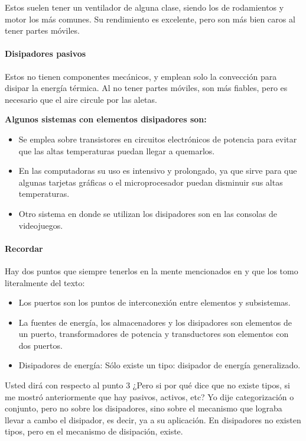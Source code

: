 Estos suelen tener un ventilador de alguna clase, siendo los de rodamientos y motor los más comunes. Su rendimiento es excelente, pero son más bien caros al tener partes móviles.\

\paragraph{Disipadores pasivos}
Estos no tienen componentes mecánicos, y emplean solo la convección para disipar la energía térmica. Al no tener partes móviles, son más fiables, pero es necesario que el aire circule por las aletas.

\textbf{Algunos sistemas con elementos disipadores son:}

\begin{itemize}
	\item Se emplea sobre transistores en circuitos electrónicos de potencia para evitar que las altas temperaturas puedan llegar a quemarlos.
	\item En las computadoras su uso es intensivo y prolongado, ya que sirve para que algunas tarjetas gráficas o el microprocesador puedan disminuir sus altas temperaturas.
	\item Otro sistema en donde se utilizan los disipadores son en las consolas de videojuegos.
\end{itemize}

\paragraph{Recordar}

Hay dos puntos que siempre tenerlos en la mente mencionados en \cite{w1} y que los tomo literalmente del texto:

\begin{itemize}
	\item Los puertos son los puntos de interconexión entre elementos y
	subsistemas.
	\item La fuentes de energía, los almacenadores y los disipadores son
	elementos de un puerto, transformadores de potencia y transductores
	son elementos con dos puertos.
	\item Disipadores de energía: Sólo existe un tipo: disipador de energía
	generalizado.

\end{itemize}

Usted dirá con respecto al punto 3 ¿Pero si por qué dice que no existe tipos, si me mostró anteriormente que hay pasivos, activos, etc? Yo dije categorización o conjunto, pero no sobre los disipadores, sino sobre el mecanismo que lograba llevar a cambo el disipador, es decir, ya a su aplicación. En disipadores no existen tipos, pero en el mecanismo de disipación, existe.
	

